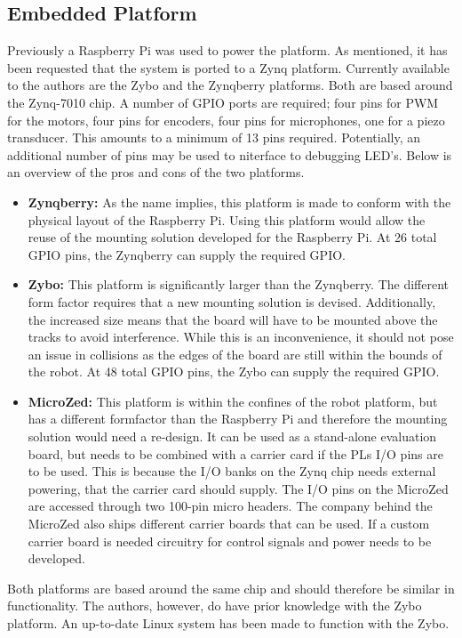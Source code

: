 \subsection{Embedded Platform} %
\label{sub:embedded_platform}
Previously a Raspberry Pi was used to power the platform.
As mentioned, it has been requested that the system is ported to a Zynq platform.
Currently available to the authors are the Zybo and the Zynqberry platforms.
Both are based around the Zynq-7010 chip.
A number of GPIO ports are required; four pins for PWM for the motors, four pins for encoders, four pins for microphones, one for a piezo transducer.
This amounts to a minimum of 13 pins required.
Potentially, an additional number of pins may be used to niterface to debugging LED's.
Below is an overview of the pros and cons of the two platforms.
\begin{itemize}
	\item \textbf{Zynqberry:} As the name implies, this platform is made to conform with the physical layout of the Raspberry Pi.
	Using this platform would allow the reuse of the mounting solution developed for the Raspberry Pi.
	At 26 total GPIO pins, the Zynqberry can supply the required GPIO\@.
	\item \textbf{Zybo:} This platform is significantly larger than the Zynqberry.
	The different form factor requires that a new mounting solution is devised.
	Additionally, the increased size means that the board will have to be mounted above the tracks to avoid interference.
	While this is an inconvenience, it should not pose an issue in collisions as the edges of the board are still within the bounds of the robot.
	At 48 total GPIO pins, the Zybo can supply the required GPIO\@.
	\item \textbf{MicroZed:}
	This platform is within the confines of the robot platform, but has a different formfactor than the Raspberry Pi and therefore the mounting solution would need a re-design.
	It can be used as a stand-alone evaluation board, but needs to be combined with a carrier card if the PLs I/O pins are to be used.
	This is because the I/O banks on the Zynq chip needs external powering, that the carrier card should supply.
	The I/O pins on the MicroZed are accessed through two 100-pin micro headers.
	The company behind the MicroZed also ships different carrier boards that can be used.
	If a custom carrier board is needed circuitry for control signals and power needs to be developed.

\end{itemize}
Both platforms are based around the same chip and should therefore be similar in functionality.
The authors, however, do have prior knowledge with the Zybo platform.
An up-to-date Linux system has been made to function with the Zybo.

